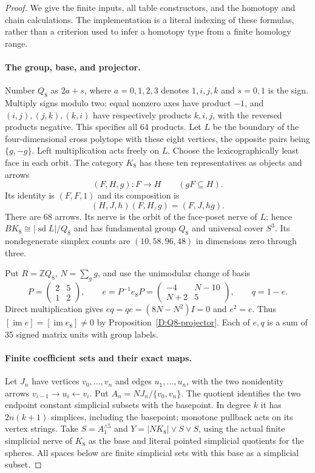 \begin{proof}
We give the finite inputs, all table constructors, and the homotopy and
chain calculations. The implementation is a literal indexing of these
formulas, rather than a criterion used to infer a homotopy type from
a finite homology range.

\paragraph{The group, base, and projector.}
Number $Q_8$ as $2a+s$, where $a=0,1,2,3$ denotes $1,i,j,k$ and
$s=0,1$ is the sign. Multiply signs modulo two; equal nonzero axes
have product $-1$, and $(i,j),(j,k),(k,i)$ have respectively products
$k,i,j$, with the reversed products negative. This specifies all
64 products. Let $L$ be the boundary of the four-dimensional cross
polytope with these eight vertices, the opposite pairs being
$\{g,-g\}$. Left multiplication acts freely on $L$.
Choose the lexicographically least face in each orbit. The category
$K_8$ has these ten representatives as objects and arrows
\[
 (F,H,g):F\longrightarrow H\qquad(gF\subseteq H).
\]
Its identity is $(F,F,1)$ and its composition is
\[
 (H,J,h)(F,H,g)=(F,J,hg).
\]
There are 68 arrows. Its nerve is the orbit of the face-poset nerve
of $L$; hence $BK_8\cong|\operatorname{sd}L|/Q_8$ and has
fundamental group $Q_8$ and universal cover $S^3$. Its nondegenerate
simplex counts are $(10,58,96,48)$ in dimensions zero through three.

Put $R=\mathbb ZQ_8$, $N=\sum_g g$, and use the unimodular change
of basis
\[
 P=\begin{pmatrix}2&5\\1&2\end{pmatrix},\qquad
 e=P^{-1}e_8P=
 \begin{pmatrix}-4&N-10\\N+2&5\end{pmatrix},\qquad q=1-e.
\]
Direct multiplication gives
$eq=qe=(8N-N^2)I=0$ and $e^2=e$. Thus
$[\operatorname{im}e]=[\operatorname{im}e_8]\ne0$ by
Proposition~\ref{D:Q8-projector}.
Each of $e,q$ is a sum of 35 signed matrix units with group labels.

\paragraph{Finite coefficient sets and their exact maps.}
Let $J_n$ have vertices $v_0,\ldots,v_n$ and edges
$u_1,\ldots,u_n$, with the two nonidentity arrows
$v_{i-1}\to u_i\leftarrow v_i$. Put
$A_n=NJ_n/\{v_0,v_n\}$. The quotient identifies the two endpoint
constant simplicial subsets with the basepoint. In degree $k$ it has
$2n(k+1)$ simplices, including the basepoint; monotone pullback acts
on its vertex strings. Take $S=A_1^{\wedge5}$ and
$Y=|NK_8|\vee S\vee S$, using the actual finite simplicial nerve
of $K_8$ as the base and literal pointed simplicial quotients for
the spheres. All spaces below are finite simplicial sets with this
base as a simplicial subset.


\end{proof}
